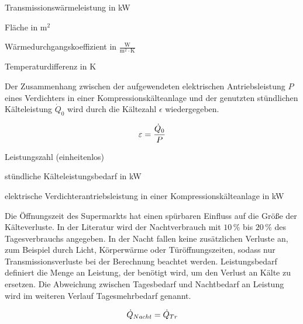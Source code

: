 \begin{description}[\dth]

	\item[$\ptrans$] Transmissionswärmeleistung in kW
	\item[$A$] Fläche in $\mathrm{m^2}$
	\item[$k$] Wärmedurchgangskoeffizient in $\mathrm{\frac{W}{m^2 \cdot
	K}}$
	\item[$\Delta\: t$] Temperaturdifferenz in K

\end{description}
\vspace{0.5cm}

Der Zusammenhang zwischen der aufgewendeten elektrischen Antriebsleistung $P$
eines Verdichters in einer Kompressionskälteanlage und der genutzten
st\"undlichen Kälteleistung ${\dot{Q}}_0$ wird durch die Kältezahl $\epsilon$
wiedergegeben.

\begin{equation}
	\epsilon = \frac{\pkalt}{P}
\label{epsilon}
\end{equation}

\begin{description}[\dth]

	\item[$\epsilon$] Leistungszahl (einheitenlos)
	\item[$\pkalt$] st\"undliche Kälteleistungsbedarf in kW
	\item[$P$] elektrische Verdichterantriebsleistung in einer
		Kompressionskälteanlage in kW

\end{description}
\vspace{0.5cm}

Die Öffnungszeit des Supermarkts hat einen spürbaren Einfluss auf die Größe der
K\"alteverluste. In der Literatur wird der Nachtverbrauch mit $10\,\%$ bis $20\,\%$
des Tagesverbrauchs angegeben\cite{kauffeld}.  In der Nacht fallen keine
zusätzlichen Verluste an, zum Beispiel durch Licht, Körperwärme oder
Türöffnungszeiten, sodass nur Transmissionsverluste bei der Berechnung beachtet
werden. Leistungsbedarf definiert die Menge an Leistung, der ben\"otigt wird, um
den Verlust an K\"alte zu ersetzen. Die Abweichung zwischen Tagesbedarf und
Nachtbedarf an Leistung wird im weiteren Verlauf Tagesmehrbedarf genannt.

\begin{equation}
	\dot{Q}_{Nacht}=\ptrans
\label{pnacht}
\end{equation}

